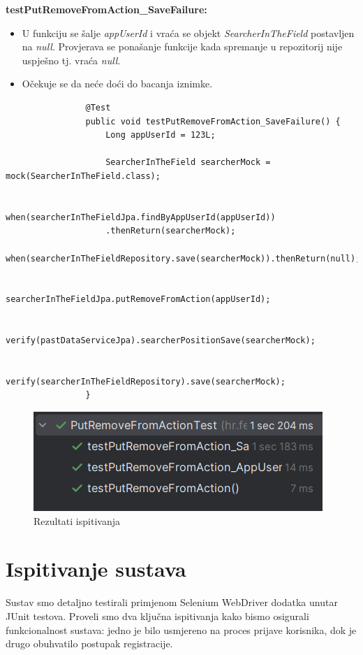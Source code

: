			\textbf{testPutRemoveFromAction\_SaveFailure:}
			\begin{itemize}
				\item U funkciju se šalje \textit{appUserId} i vraća se objekt \textit{SearcherInTheField} postavljen na \textit{null}. Provjerava se ponašanje funkcije kada spremanje u repozitorij nije uspješno tj. vraća \textit{null}.
				\item Očekuje se da neće doći do bacanja iznimke.
			\end{itemize}
			\begin{lstlisting}
				@Test
				public void testPutRemoveFromAction_SaveFailure() {
					Long appUserId = 123L;
					
					SearcherInTheField searcherMock = mock(SearcherInTheField.class);
					
					when(searcherInTheFieldJpa.findByAppUserId(appUserId))
					.thenReturn(searcherMock);
					when(searcherInTheFieldRepository.save(searcherMock)).thenReturn(null);
					
					searcherInTheFieldJpa.putRemoveFromAction(appUserId);
					
					verify(pastDataServiceJpa).searcherPositionSave(searcherMock);
					
					verify(searcherInTheFieldRepository).save(searcherMock);
				}
			\end{lstlisting}
			
			\begin{figure}[H]
				\includegraphics[scale=1]{slike/putRemoveFromActionTest.png} 
				\centering
				\caption{Rezultati ispitivanja}
				\label{fig:putRemoveFromActionTest}
			\end{figure}
			
			
			\section{Ispitivanje sustava}
			
			
			Sustav smo detaljno testirali primjenom Selenium WebDriver dodatka unutar JUnit testova. Proveli smo dva ključna ispitivanja kako bismo osigurali funkcionalnost sustava: jedno je bilo usmjereno na proces prijave korisnika, dok je drugo obuhvatilo postupak registracije.
			

